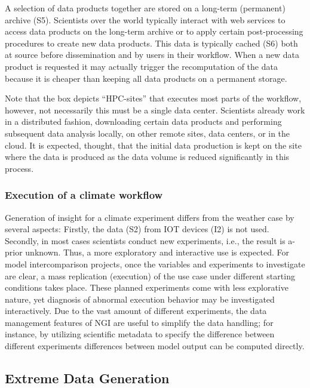 \documentclass[a4paper, twocolumn]{article}
\begin{document}
A selection of data products together are stored on a long-term (permanent) archive (S5).
Scientists over the world typically interact with web services to access data products on the long-term archive or to apply certain post-processing procedures to create new data products. This data is typically cached (S6) both at source before dissemination and by users in their workflow. When a new data product is requested it may actually trigger the recomputation of the data because it is cheaper than keeping all data products on a permanent storage.

Note that the box depicts “HPC-sites” that executes most parts of the workflow, however, not necessarily this must be a single data center. Scientists already work in a distributed fashion, downloading certain data products and performing subsequent data analysis locally, on other remote sites, data centers, or in the cloud. It is expected, thought, that the initial data production is kept on the site where the data is produced as the data volume is reduced significantly in this process.

\subsubsection{Execution of a climate workflow}

Generation of insight for a climate experiment differs from the weather case by several aspects: Firstly, the data (S2) from IOT devices (I2) is not used.
Secondly, in most cases scientists conduct new experiments, i.e., the result is a-prior unknown. Thus, a more exploratory and interactive use is expected.
For model intercomparison projects, once the variables and experiments to investigate are clear, a mass replication (execution) of the use case under different starting conditions takes place. These planned experiments come with less explorative nature, yet diagnosis of abnormal execution behavior may be investigated interactively.
Due to the vast amount of different experiments, the data management features of NGI are useful to simplify the data handling; for instance, by utilizing scientific metadata to specify the difference between different experiments differences between model output can be computed directly.


\subsection{Extreme Data Generation}
\end{document}
